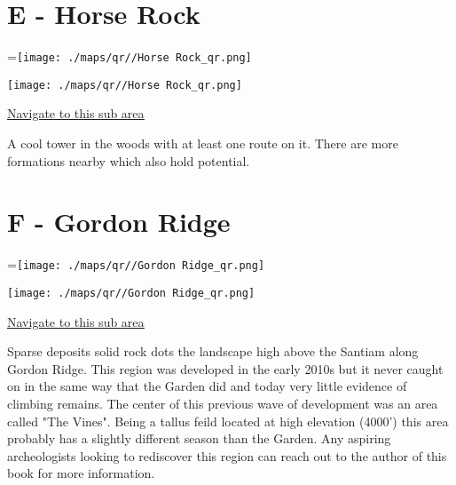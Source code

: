 \begin{multicols}{2}
\vfill\null
\columnbreak

\section{E - Horse Rock}\label{sa:Horse Rock}
=\hbox{\texttt{[image: ./maps/qr//Horse Rock\_qr.png]}}%
\begin{center}
\texttt{[image: ./maps/qr//Horse Rock\_qr.png]}
\end{center}
\begin{center}
\underline{\textcolor{blue}{\href{http://maps.google.com/maps?q=44.31343,-122.33943}{Navigate to this sub area}}}
\end{center}


A cool tower in the woods with at least one route on it. There are more formations nearby which also hold potential.\\




\vfill\null
\columnbreak

\section{F - Gordon Ridge}\label{sa:Gordon Ridge}
=\hbox{\texttt{[image: ./maps/qr//Gordon Ridge\_qr.png]}}%
\begin{center}
\texttt{[image: ./maps/qr//Gordon Ridge\_qr.png]}
\end{center}
\begin{center}
\underline{\textcolor{blue}{\href{http://maps.google.com/maps?q=44.34844,-122.34942}{Navigate to this sub area}}}
\end{center}


Sparse deposits solid rock dots the landscape high above the Santiam along Gordon Ridge. This region was developed in the early 2010s but it never caught on in the same way that the Garden did and today very little evidence of climbing remains. The center of this previous wave of development was an area called "The Vines". Being a tallus feild located at high elevation (4000') this area probably has a slightly different season than the Garden. Any aspiring archeologists looking to rediscover this region can reach out to the author of this book for more information.\\





\end{multicols}
